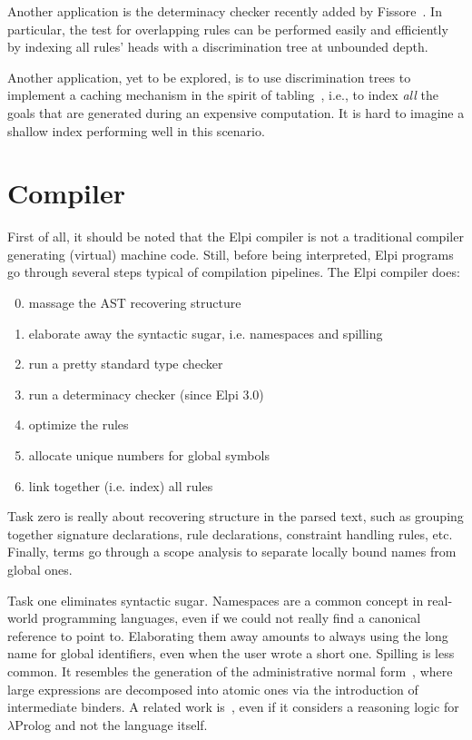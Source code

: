 \documentclass[a4paper, 11pt]{book}
\begin{document}
Another application is the determinacy checker recently added by
Fissore~\cite{elpidet}. In particular, the test for overlapping rules can be
performed easily and efficiently by indexing all rules' heads with a
discrimination tree at unbounded depth.


Another application, yet to be explored, is to use discrimination trees to
implement a caching mechanism in the spirit of tabling~\cite{10.1145/191839.191927,10.1007/11532231_5,selsam2020tabledtypeclassresolution}, i.e., to index
\emph{all} the goals that are generated during an expensive computation. It is
hard to imagine a shallow index performing well in this scenario.

\section{Compiler}\label{sec:compiler}


First of all, it should be noted that the Elpi compiler is not a traditional
compiler generating (virtual) machine code. Still, before being interpreted, Elpi
programs go through several steps typical of compilation pipelines. The Elpi
compiler does:

\begin{enumerate}
  \setcounter{enumi}{-1}
  \item massage the AST recovering structure
  \item elaborate away the syntactic sugar, i.e. namespaces and spilling
  \item run a pretty standard type checker
  \item run a determinacy checker (since Elpi 3.0)
  \item optimize the rules
  \item allocate unique numbers for global symbols
  \item link together (i.e. index) all rules
\end{enumerate}

\noindent
Task zero is really about recovering structure in the parsed text, such as
grouping together signature declarations, rule declarations, constraint
handling rules, etc. Finally, terms go through a scope analysis to separate
locally bound names from global ones.


Task one eliminates syntactic sugar. Namespaces are a common concept in
real-world programming languages, even if we could not really find a canonical
reference to point to. Elaborating them away amounts to always using the long
name for global identifiers, even when the user wrote a short one. Spilling is
less common. It resembles the generation of the administrative normal
form~\cite{10.1145/141478.141563}, where large expressions are decomposed
into atomic ones via the introduction of intermediate binders. A related work
is~\cite{chaudhuri:hal-01806154}, even if it considers a reasoning logic for
$\lambda$Prolog and not the language itself.
\end{document}
